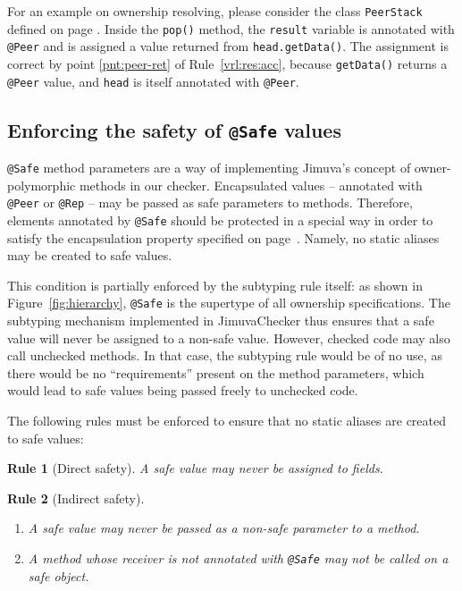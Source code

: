 \documentclass{pracamgr}
\theoremstyle{break}
\theoremstyle{break}
\theoremstyle{break}
\newtheorem{verrule}{Rule}
\begin{document}
For an example on ownership resolving, please consider the class
\texttt{PeerStack} defined on page \pageref{lst:stack-peer}. Inside
the \texttt{pop()} method, the \texttt{result} variable is annotated
with \texttt{@Peer} and is assigned a value returned from
\texttt{head.getData()}. The assignment is correct by point
\ref{pnt:peer-ret} of Rule~\ref{vrl:res:acc}, because
\texttt{getData()} returns a \texttt{@Peer} value, and \texttt{head}
is itself annotated with \texttt{@Peer}.

\subsection{Enforcing the safety of \texttt{@Safe} values}
\label{sec:chk:safe}

\texttt{@Safe} method parameters are a way of implementing Jimuva's
concept of owner-polymorphic methods in our checker. Encapsulated
values -- annotated with \texttt{@Peer} or \texttt{@Rep} -- may be
passed as safe parameters to methods. Therefore, elements annotated by
\texttt{@Safe} should be protected in a special way in order to
satisfy the encapsulation property specified on
page~\pageref{inv:encap}. Namely, no static aliases may be created to
safe values.

This condition is partially enforced by the subtyping rule itself: as
shown in Figure~\ref{fig:hierarchy}, \texttt{@Safe} is the supertype
of all ownership specifications. The subtyping mechanism implemented
in JimuvaChecker thus ensures that a safe value will never be assigned
to a non-safe value. However, checked code may also call unchecked
methods. In that case, the subtyping rule would be of no use, as there
would be no ``requirements'' present on the method parameters, which
would lead to safe values being passed freely to unchecked code.

The following rules must be enforced to ensure that no static aliases
are created to safe values:

\begin{verrule}[Direct safety]
  A safe value may never be assigned to fields. 
\end{verrule}
\vspace{-1cm}
\begin{verrule}[Indirect safety]
  \begin{enumerate}[label=(\arabic*)]
  \item A safe value may never be passed as a non-safe parameter to a
    method.
  \item A method whose receiver is not annotated with \texttt{@Safe}
    may not be called on a safe object.
  \end{enumerate}
\end{verrule}
\end{document}
